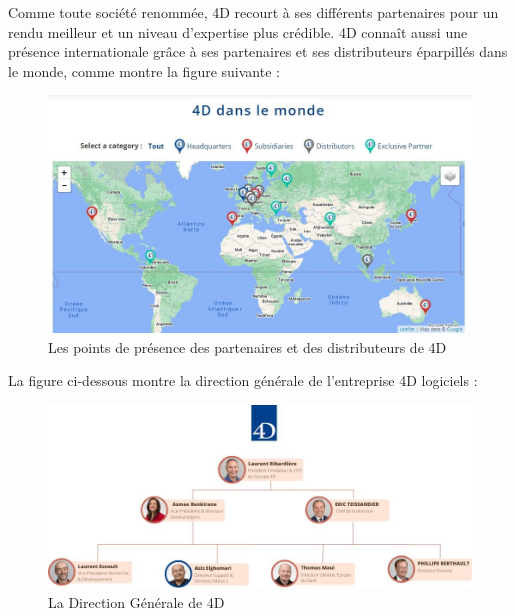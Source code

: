 Comme toute société renommée, 4D recourt à ses différents partenaires 
pour un rendu meilleur et un niveau d’expertise plus crédible. 4D connaît aussi 
une présence internationale grâce à ses partenaires et ses distributeurs éparpillés 
dans le monde, comme montre la figure suivante :

\begin{figure}[h]
    \centering
    \includegraphics[scale=0.6]{Figures/carte.jpg} %
    \caption{Les points de présence des partenaires et des distributeurs de 4D}
    \label{fig:carte}
\end{figure}

\vspace{6cm}

La figure ci-dessous montre la direction générale de l’entreprise 4D logiciels :



\begin{figure}[h]
    \centering
    \includegraphics[scale=0.6]{Figures/direction.jpg} %
    \caption{La Direction Générale de 4D}
    \label{fig:direction}
\end{figure}

